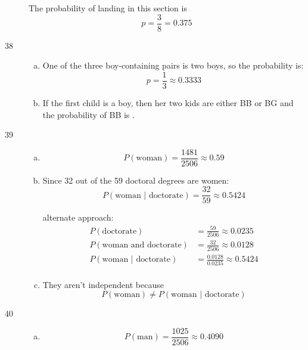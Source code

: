 \documentclass[letterpaper]{exam}
\begin{document}
\begin{description}
        The probability of landing in this section is 
        \[
          p = \frac{3}{8} = \boxed{ 0.375 }
        \]

      \item[38]
        \begin{enumerate}[(a)]
          \item One of the three boy-containing pairs is two boys, so the
            probability is:
            \[
              p = \frac{1}{3} \approx \boxed{ 0.3333 }
            \]

          \item If the first child is a boy, then her two kids are either BB or
            BG and the probability of BB is .
        \end{enumerate}

      \item[39]
        \begin{enumerate}[(a)]
          \item 
            \[
              P(\text{woman}) = \frac{1481}{2506} \approx \boxed{ 0.59 }
            \]

          \item
            Since 32 out of the 59 doctoral degrees are women:
            \[
              P( \text{woman } | \text { doctorate} ) = \frac{32}{59} 
                \approx \boxed{ 0.5424 }
            \]

            alternate approach:
            \begin{align*}
              P( \text{doctorate} )                   & = \frac{59}{2506} \approx 0.0235 \\
              P( \text{woman and doctorate} )         & = \frac{32}{2506} \approx 0.0128 \\
              P( \text{woman } | \text { doctorate} ) & = \frac{0.0128}{0.0235}
                \approx 0.5424 \\
            \end{align*}

          \item They aren't independent because 
            \[
              P(\text {woman}) \neq P( \text{woman } | \text { doctorate} )
            \]

        \end{enumerate}

      \item[40]
        \begin{enumerate}[(a)]
          \item 
            \[
              P(\text{man}) = \frac{1025}{2506} \approx \boxed{ 0.4090 }
            \]


\end{enumerate}
\end{description}
\end{document}
